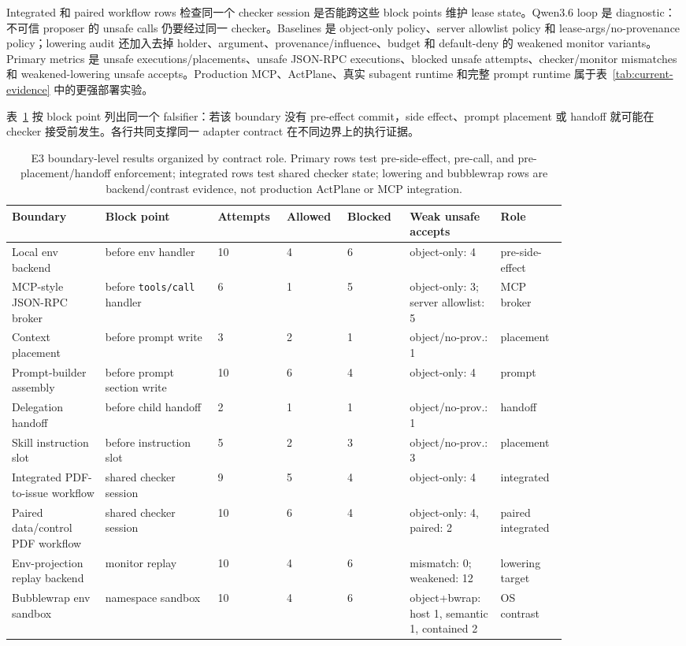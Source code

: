 \documentclass[UTF8,a4paper,11pt]{ctexart}
\begin{document}
Integrated 和 paired workflow rows 检查同一个 checker session 是否能跨这些 block points 维护 lease state。Qwen3.6 loop 是 diagnostic：不可信 proposer 的 unsafe calls 仍要经过同一 checker。Baselines 是 object-only policy、server allowlist policy 和 lease-args/no-provenance policy；lowering audit 还加入去掉 holder、argument、provenance/influence、budget 和 default-deny 的 weakened monitor variants。Primary metrics 是 unsafe executions/placements、unsafe JSON-RPC executions、blocked unsafe attempts、checker/monitor mismatches 和 weakened-lowering unsafe accepts。Production MCP、ActPlane、真实 subagent runtime 和完整 prompt runtime 属于表~\ref{tab:current-evidence} 中的更强部署实验。

表~\ref{tab:e3-boundary-results} 按 block point 列出同一个 falsifier：若该 boundary 没有 pre-effect commit，side effect、prompt placement 或 handoff 就可能在 checker 接受前发生。各行共同支撑同一 adapter contract 在不同边界上的执行证据。

\begin{table}[t]
\centering
\scriptsize
\setlength{\tabcolsep}{2pt}
\caption{E3 boundary-level results organized by contract role. Primary rows test pre-side-effect, pre-call, and pre-placement/handoff enforcement; integrated rows test shared checker state; lowering and bubblewrap rows are backend/contrast evidence, not production ActPlane or MCP integration.}
\label{tab:e3-boundary-results}
\begin{tabular}{p{0.15\linewidth}p{0.18\linewidth}p{0.08\linewidth}p{0.08\linewidth}p{0.10\linewidth}p{0.13\linewidth}p{0.10\linewidth}}
\toprule
Boundary & Block point & Attempts & Allowed & Blocked & Weak unsafe accepts & Role \\
\midrule
Local env backend & before env handler & 10 & 4 & 6 & object-only: 4 & pre-side-effect \\
MCP-style JSON-RPC broker & before \texttt{tools/call} handler & 6 & 1 & 5 & object-only: 3; server allowlist: 5 & MCP broker \\
Context placement & before prompt write & 3 & 2 & 1 & object/no-prov.: 1 & placement \\
Prompt-builder assembly & before prompt section write & 10 & 6 & 4 & object-only: 4 & prompt \\
Delegation handoff & before child handoff & 2 & 1 & 1 & object/no-prov.: 1 & handoff \\
Skill instruction slot & before instruction slot & 5 & 2 & 3 & object/no-prov.: 3 & placement \\
Integrated PDF-to-issue workflow & shared checker session & 9 & 5 & 4 & object-only: 4 & integrated \\
Paired data/control PDF workflow & shared checker session & 10 & 6 & 4 & object-only: 4, paired: 2 & paired integrated \\
Env-projection replay backend & monitor replay & 10 & 4 & 6 & mismatch: 0; weakened: 12 & lowering target \\
Bubblewrap env sandbox & namespace sandbox & 10 & 4 & 6 & object+bwrap: host 1, semantic 1, contained 2 & OS contrast \\
\bottomrule
\end{tabular}
\end{table}
\end{document}
